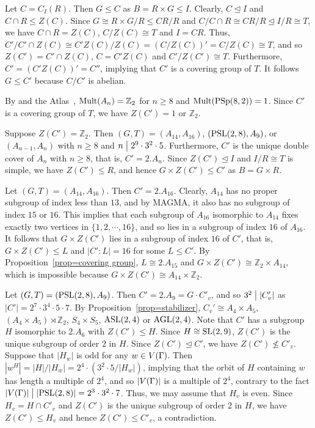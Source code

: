 \documentclass[12pt]{article}
\def\di{\bigm|} \def\lg{\langle} \def\rg{\rangle}
\def\PSL{\hbox{\rm PSL}}\def\PSU{\hbox{\rm PSU}}
\def\PSp{\hbox{\rm PSp}}\def\P\GammaL{\hbox{\rm P\Gamma L}} \def\ASIL{\hbox{\rm A\Sigma L}}
\def\mz{{\mathbb Z}}
\begin{document}
Let $C=C_I(R)$. Then $G\leq C$ as $B=R\times G\leq I$. Clearly, $C\unlhd I$ and $C\cap R\leq Z(C)$.
Since $G\cong R\times G/R\leq CR/R$ and $C/C\cap R\cong CR/R\unlhd I/R\cong T$, we have  $C\cap R=Z(C)$, $C/Z(C)\cong T$
and $I=CR$. Thus, $C'/C'\cap Z(C)\cong C'Z(C)/Z(C)=(C/Z(C))'=C/Z(C)\cong  T$, and so  $Z(C')=C'\cap Z(C)$, $C=C'Z(C)$ and $C'/Z(C')\cong T$. Furthermore, $C'=(C'Z(C))'=C''$, implying that $C'$ is a covering group of $T$. It follows $G\leq C'$ because $C/C'$ is abelian.


By \cite[Theorem 5.1.4]{Kleidman} and the Atlas~\cite[p. 123]{Atlas}, $\Mult(A_n)=\mz_2$ for $n\geq 8$ and $\Mult(\PSp(8,2))=1$. Since $C'$ is a covering group of $T$, we have $Z(C')=1$ or $\mz_2$.

Suppose $Z(C')=\mz_2$. Then $(G,T)=(A_{14},A_{16})$, $(\PSL(2,8),A_9)$, or $(A_{n-1},A_n)$ with $n\geq 8$
and $n\di 2^9\cdot 3^2\cdot 5$. Furthermore, $C'$ is the unique double cover of $A_n$ with $n\geq 8$,
that is, $C'=2.A_n$. Since $Z(C')\unlhd I$ and $I/R\cong T$ is simple, we have $Z(C')\leq R$, and hence
$G\times Z(C')\leq C'$ as $B=G\times R$.

Let $(G,T)=(A_{14},A_{16})$. Then $C'=2.A_{16}$. Clearly, $A_{14}$ has no proper subgroup of index less than $13$, and by MAGMA, it also has no subgroup of index $15$ or $16$. This implies that each subgroup of $A_{16}$ isomorphic to $A_{14}$ fixes exactly two vertices in $\{1,2,\cdots, 16\}$, and so lies in a subgroup of index $16$ of  $A_{16}$. It follows that $G\times Z(C')$ lies in a subgroup of index $16$ of  $C'$, that is, $G\times Z(C')\leq L$ and $|C':L|=16$ for some $L\leq C'$. By Proposition~\ref{prop=covering group}, $L\cong 2.A_{15}$ and $G\times Z(C')\cong \mz_2\times A_{14}$, which is impossible because  $G\times Z(C')\cong A_{14}\times\mz_2$.

Let $(G,T)=(\PSL(2,8),A_9)$. Then $C'=2.A_{9}=G\cdot C'_v$, and so $3^2 \di |C'_v|$ as $|C'|=2^7\cdot 3^4\cdot 5\cdot7$. By Proposition~\ref{prop=stabilizer}, $C_v'\cong A_4\times A_5$,
$(A_4\times A_5)\rtimes \mz_2$, $S_4\times S_5$, $\rm ASL(2,4)$ or $\rm AGL(2,4)$. Note that $C'$ has a subgroup $H$ isomorphic to $2.A_6$ with $Z(C')\leq H$. Since $H\cong \rm SL(2,9)$, $Z(C')$ is the unique subgroup of order $2$ in $H$. Since $Z(C')\unlhd C'$, we have $Z(C')\nleq C'_v$. Suppose that $|H_w|$ is odd for any $w\in V(\Gamma)$.
Then $|w^H|=|H|/|H_w|=2^4\cdot (3^2\cdot 5/|H_w|)$, implying that the orbit of $H$ containing $w$ has length
a multiple of $2^4$, and so $|V(\Gamma)|$ is a multiple of $2^4$, contrary to the fact
$|V(\G)|\di|\PSL(2,8)|=2^3\cdot 3^2\cdot 7$. Thus, we may assume that $H_v$ is even.
Since $H_v=H\cap C'_v$ and  $Z(C')$ is the unique subgroup of order $2$ in $H$, we have
$Z(C')\leq H_v$ and hence $Z(C')\leq C'_v$, a contradiction.
\end{document}
